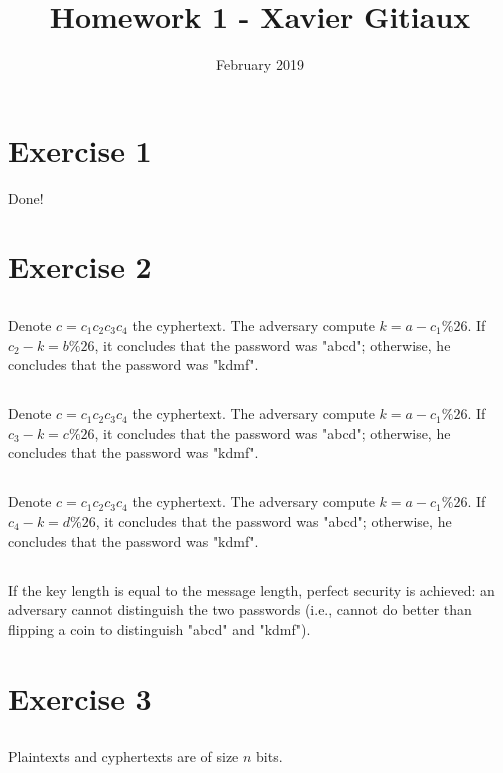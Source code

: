 \documentclass{article}
\title{Homework 1 - Xavier Gitiaux}
\author{}
\date{February 2019}
\begin{document}
\maketitle

\section{Exercise 1}
Done!

\section{Exercise 2}

\subsection{}
Denote $c=c_{1}c_{2}c_{3}c_{4}$ the cyphertext. The adversary compute $k= a - c_{1} \% 26$. If $c_{2} - k = b\%26$, it concludes that the password was "abcd"; otherwise, he concludes that the password was "kdmf". 

\subsection{}
Denote $c=c_{1}c_{2}c_{3}c_{4}$ the cyphertext. The adversary compute $k= a - c_{1} \% 26$. If $c_{3} - k = c\%26$, it concludes that the password was "abcd"; otherwise, he concludes that the password was "kdmf". 

\subsection{}
Denote $c=c_{1}c_{2}c_{3}c_{4}$ the cyphertext. The adversary compute $k= a - c_{1} \% 26$. If $c_{4} - k = d\%26$, it concludes that the password was "abcd"; otherwise, he concludes that the password was "kdmf". 

\subsection{}
If the key length is equal to the message length, perfect security is achieved: an adversary cannot distinguish the two passwords (i.e., cannot do better than flipping a coin to distinguish "abcd" and "kdmf"). 

\section{Exercise 3}

\subsection{}
Plaintexts and cyphertexts are of size $n$ bits. 
\end{document}
